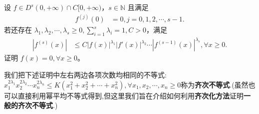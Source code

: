 \documentclass[../../main.tex]{subfiles}%
\begin{document}
\begin{proposition}\label{proposition:齐次化方法/关于导数乘积不等式问题}
设 $f \in D^s(0,+\infty) \cap C[0,+\infty)$，$s \in \mathbb{N}$ 且满足
\begin{align*}
f^{(j)}(0) &= 0, j = 0, 1, 2, \cdots, s - 1.
\end{align*}
若还存在 $\lambda_1, \lambda_2, \cdots, \lambda_s \geqslant  0, \sum_{i=1}^{s} \lambda_i = 1, C > 0$，满足
\begin{align}\label{example7.10-0.1}
\left| f^{(s)}(x) \right| &\leqslant  C \left| f(x) \right|^{\lambda_1} \left| f'(x) \right|^{\lambda_2} \cdots \left| f^{(s-1)}(x) \right|^{\lambda_s}, \forall x \geqslant  0.
\end{align}
证明 $f(x) = 0, \forall x \geqslant  0$。
\end{proposition}
\begin{note}
我们把下述证明中左右两边各项次数均相同的不等式:$x_{1}^{2\lambda _1}x_{2}^{2\lambda _2}\cdots x_{n}^{2\lambda _n}\leqslant K\left( x_{1}^{2}+x_{2}^{2}+\cdots +x_{n}^{2} \right) ,\forall x_1,x_2,\cdots ,x_n\geqslant 0$称为\textbf{齐次不等式}.(虽然也可以直接利用幂平均不等式得到,但这里我们旨在介绍如何利用\textbf{齐次化方法}证明\textbf{一般的齐次不等式}.)
\end{note}
\end{document}
